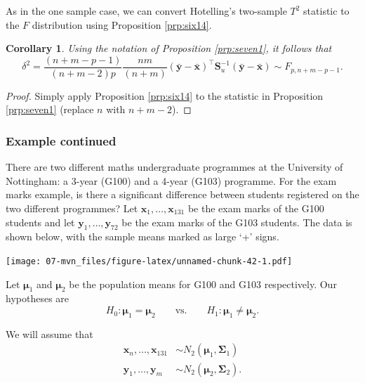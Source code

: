 \documentclass[]{book}
\newtheorem{corollary}{Corollary}[chapter]
\theoremstyle{definition}
\theoremstyle{definition}
\theoremstyle{definition}
\theoremstyle{remark}
\begin{document}
As in the one sample case, we can convert Hotelling's two-sample \(T^2\) statistic to the \(F\) distribution using Proposition \ref{prp:six14}.

\begin{corollary}
\protect\hypertarget{cor:cseven1}{}{\label{cor:cseven1} }Using the notation of Proposition \ref{prp:seven1}, it follows that
\[\delta^2 = \frac{(n+m-p-1)}{(n+m-2)p} \frac{nm}{(n+m)} (\bar{\mathbf y} - \bar{\mathbf x})^\top \mathbf S_u^{-1} (\bar{\mathbf y} - \bar{\mathbf x}) \sim F_{p,n+m-p-1}.\]
\end{corollary}

\begin{proof}
{}Simply apply Proposition \ref{prp:six14} to the statistic in Proposition \ref{prp:seven1} (replace \(n\) with \(n+m-2\)).
\end{proof}

\hypertarget{example-continued-2}{%
\subsubsection*{Example continued}\label{example-continued-2}}

There are two different maths undergraduate programmes at the University of Nottingham: a 3-year (G100) and a 4-year (G103) programme. For the exam marks example, is there a significant difference between students registered on the two different programmes? Let \(\mathbf x_1,\ldots, \mathbf x_{131}\) be the exam marks of the G100 students and let \(\mathbf y_1,\ldots, \mathbf y_{72}\) be the exam marks of the G103 students. The data is shown below, with the sample means marked as large `+' signs.

\texttt{[image: 07-mvn\_files/figure-latex/unnamed-chunk-42-1.pdf]}

Let \({\boldsymbol{\mu}}_1\) and \({\boldsymbol{\mu}}_2\) be the population means for G100 and G103 respectively. Our hypotheses are
\[H_0: {\boldsymbol{\mu}}_1 = {\boldsymbol{\mu}}_2 \qquad \text{vs.} \qquad H_1: {\boldsymbol{\mu}}_1 \neq {\boldsymbol{\mu}}_2.\]

We will assume that
\begin{align*}
\mathbf x_n, \ldots, \mathbf x_{131}&\sim N_2({\boldsymbol{\mu}}_1,\boldsymbol{\Sigma}_1)\\
\mathbf y_1,\ldots,\mathbf y_m &\sim  N_2({\boldsymbol{\mu}}_2,\boldsymbol{\Sigma}_2).
\end{align*}
\end{document}
